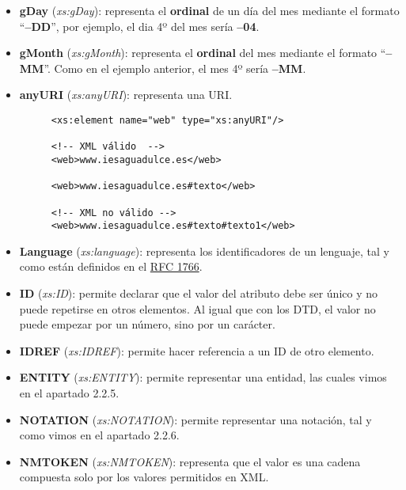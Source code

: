 \begin{itemize}
    \item \textbf{gDay} (\textit{xs:gDay}): representa el \textbf{ordinal} de un día del mes mediante el formato ``\textbf{--DD}'', por ejemplo, el dia 4º del mes sería \textbf{--04}.
    \item \textbf{gMonth} (\textit{xs:gMonth}): representa el \textbf{ordinal} del mes mediante el formato ``\textbf{--MM}''. Como en el ejemplo anterior, el mes 4º sería \textbf{--MM}.
    \item \textbf{anyURI} (\textit{xs:anyURI}): representa una URI.

    \begin{figure}[h]
        \begin{tcolorbox}[sharp corners, colback=yellow!30, colframe=white!20]
            \scriptsize
            \begin{verbatim}
<xs:element name="web" type="xs:anyURI"/>

<!-- XML válido  -->
<web>www.iesaguadulce.es</web>

<web>www.iesaguadulce.es#texto</web>

<!-- XML no válido -->
<web>www.iesaguadulce.es#texto#texto1</web>
            \end{verbatim}
        \end{tcolorbox}
    \end{figure}

    \item \textbf{Language} (\textit{xs:language}): representa los identificadores de un lenguaje, tal y como están definidos en el \href{https://www.rfc-editor.org/rfc/rfc1766}{RFC 1766}.

    \item \textbf{ID} (\textit{xs:ID}): permite declarar que el valor del atributo debe ser único y no puede repetirse en otros elementos. Al igual que con los DTD, el valor no puede empezar por un número, sino por un carácter.

    \item \textbf{IDREF} (\textit{xs:IDREF}): permite hacer referencia a un ID de otro elemento.

    \item \textbf{ENTITY} (\textit{xs:ENTITY}): permite representar una entidad, las cuales vimos en el apartado 2.2.5.

    \item \textbf{NOTATION} (\textit{xs:NOTATION}): permite representar una notación, tal y como vimos en el apartado 2.2.6.

    \item \textbf{NMTOKEN} (\textit{xs:NMTOKEN}): representa que el valor es una cadena compuesta solo por los valores permitidos en XML.
\end{itemize}

